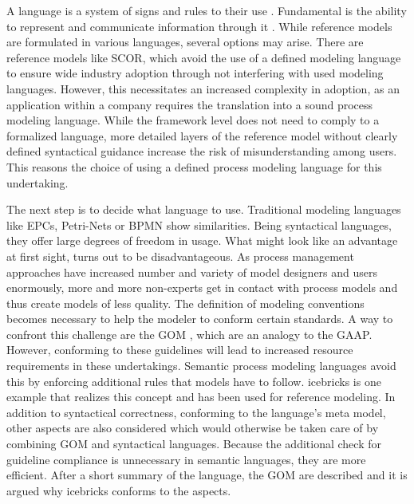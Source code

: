	 A language is a system of signs and rules to their use \citep[]{holten1999}. Fundamental is the ability to represent and communicate information through it \citep[]{brocke2003referenzmodellierung}. While reference models are formulated in various languages, several options may arise. There are reference models like \acrshort{SCOR}, which avoid the use of a defined modeling language to ensure wide industry adoption through not interfering with used modeling languages. However, this necessitates an increased complexity in adoption, as an application within a company requires the translation into a sound process modeling language. While the framework level does not need to comply to a formalized language, more detailed layers of the reference model without clearly defined syntactical guidance increase the risk of misunderstanding among users.
	 This reasons the choice of using a defined process modeling language for this undertaking.
	 
	 The next step is to decide what language to use. Traditional modeling languages like EPCs, Petri-Nets or BPMN show similarities. Being syntactical languages, they offer large degrees of freedom in usage. What might look like an advantage at first sight, turns out to be disadvantageous. As process management approaches have increased number and variety of model designers and users enormously, more and more non-experts get in contact with process models and thus create models of less quality. The definition of modeling conventions becomes necessary to help the modeler to conform certain standards. A way to confront this challenge are the \acrfull{GOM} \cite{BeckerGOM2012}, which are an analogy to the \acrfull{GAAP}. However, conforming to these guidelines will lead to increased resource requirements in these undertakings. Semantic process modeling languages avoid this by enforcing additional rules that models have to follow. icebricks \cite{becker2015icebricks} is one example that realizes this concept and has been used for reference modeling. In addition to syntactical correctness, \ie conforming to the language's meta model, other aspects are also considered which would otherwise be taken care of by combining \acrshort{GOM} and syntactical languages. Because the additional check for guideline compliance is unnecessary in semantic languages, they are more efficient. After a short summary of the language,  the \acrshort{GOM} are described and it is argued why icebricks conforms to the aspects. 
	 
